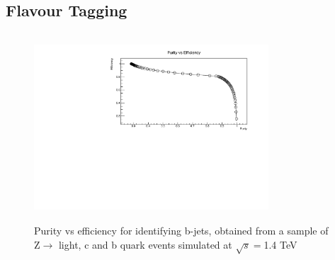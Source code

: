 \subsection{Flavour Tagging}
\label{Flavour Tagging}

\begin{figure}[t]
  \centering
  \includegraphics[width=0.78\textwidth,height=7cm,keepaspectratio]{TopAnalysis/figures/btag_crosses}
  \caption[B-Tagging Purity vs Efficiency]{Purity vs efficiency for identifying b-jets, obtained from a sample of Z$\rightarrow$ light, c and b quark events simulated at $\sqrt{s}=$1.4 TeV}
  \label{fig:Zbtagging}
\end{figure}


